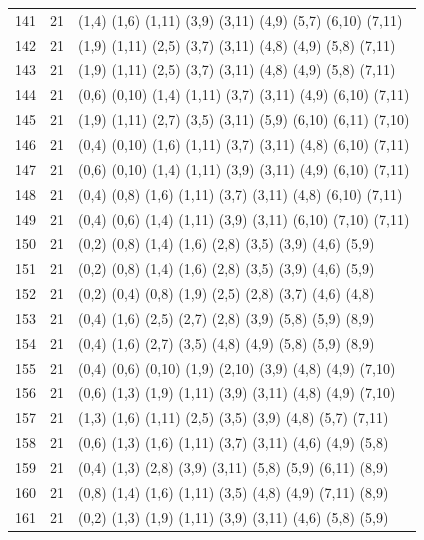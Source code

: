 \begin{appendix}
{\begin{longtable}{lll}
    141& 21 & (1,4)   (1,6)   (1,11)  (3,9)   (3,11)  (4,9)   (5,7)   (6,10)  (7,11)\\
    142& 21 & (1,9)   (1,11)  (2,5)   (3,7)   (3,11)  (4,8)   (4,9)   (5,8)   (7,11)\\
    143& 21 & (1,9)   (1,11)  (2,5)   (3,7)   (3,11)  (4,8)   (4,9)   (5,8)   (7,11)\\
    144& 21 & (0,6)   (0,10)  (1,4)   (1,11)  (3,7)   (3,11)  (4,9)   (6,10)  (7,11)\\
    145& 21 & (1,9)   (1,11)  (2,7)   (3,5)   (3,11)  (5,9)   (6,10)  (6,11)  (7,10)\\
    146& 21 & (0,4)   (0,10)  (1,6)   (1,11)  (3,7)   (3,11)  (4,8)   (6,10)  (7,11)\\
    147& 21 & (0,6)   (0,10)  (1,4)   (1,11)  (3,9)   (3,11)  (4,9)   (6,10)  (7,11)\\
    148& 21 & (0,4)   (0,8)   (1,6)   (1,11)  (3,7)   (3,11)  (4,8)   (6,10)  (7,11)\\
    149& 21 & (0,4)   (0,6)   (1,4)   (1,11)  (3,9)   (3,11)  (6,10)  (7,10)  (7,11)\\
    150& 21 & (0,2)   (0,8)   (1,4)   (1,6)   (2,8)   (3,5)   (3,9)   (4,6)   (5,9)\\
    151& 21 & (0,2)   (0,8)   (1,4)   (1,6)   (2,8)   (3,5)   (3,9)   (4,6)   (5,9)\\
    152& 21 & (0,2)   (0,4)   (0,8)   (1,9)   (2,5)   (2,8)   (3,7)   (4,6)   (4,8)\\
    153& 21 & (0,4)   (1,6)   (2,5)   (2,7)   (2,8)   (3,9)   (5,8)   (5,9)   (8,9)\\
    154& 21 & (0,4)   (1,6)   (2,7)   (3,5)   (4,8)   (4,9)   (5,8)   (5,9)   (8,9)\\
    155& 21 & (0,4)   (0,6)   (0,10)  (1,9)   (2,10)  (3,9)   (4,8)   (4,9)   (7,10)\\
    156& 21 & (0,6)   (1,3)   (1,9)   (1,11)  (3,9)   (3,11)  (4,8)   (4,9)   (7,10)\\
    157& 21 & (1,3)   (1,6)   (1,11)  (2,5)   (3,5)   (3,9)   (4,8)   (5,7)   (7,11)\\
    158& 21 & (0,6)   (1,3)   (1,6)   (1,11)  (3,7)   (3,11)  (4,6)   (4,9)   (5,8)\\
    159& 21 & (0,4)   (1,3)   (2,8)   (3,9)   (3,11)  (5,8)   (5,9)   (6,11)  (8,9)\\
    160& 21 & (0,8)   (1,4)   (1,6)   (1,11)  (3,5)   (4,8)   (4,9)   (7,11)  (8,9)\\
    161& 21 & (0,2)   (1,3)   (1,9)   (1,11)  (3,9)   (3,11)  (4,6)   (5,8)   (5,9)\\

\end{longtable}}
\end{appendix}
